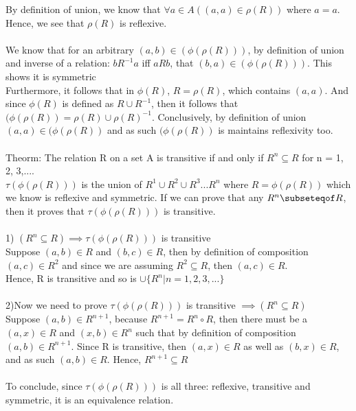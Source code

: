 \documentclass[addpoints]{exam}
\begin{document}
\begin{questions}
      \begin{solution}
    By definition of union, we know that $\forall a \in A ((a, a) \in \rho (R))$ where $a = a$. Hence, we see that $\rho (R)$ is reflexive.
    \\
    \\We know that for an arbitrary $(a, b) \in (\phi (\rho (R)))$, by definition of union and inverse of a relation: $b R^{-1} a$ iff $a R b$, that $(b, a) \in (\phi (\rho (R)))$. This shows it is symmetric
    \\Furthermore, it follows that in $\phi (R)$, $R = \rho (R) $,  which contains $(a, a)$. And since $\phi (R)$ is defined as $R \cup R^{-1}$, then it follows that $(\phi (\rho (R)) = \rho (R) \cup \rho (R)^{-1}$. Conclusively, by definition of union $(a, a) \in (\phi (\rho (R))$ and as such $(\phi (\rho (R))$ is maintains reflexivity too.
    \\
    \\Theorm: The relation R on a set A is transitive if and only if $R^n \subseteq  R$ for n = 1, 2, 3,....
    \\$\tau (\phi (\rho (R)))$ is the union of  $R^1 \cup R^2 \cup R^3 ... R^n$ where $R = \phi (\rho (R))$ which we know is reflexive and symmetric. If we can prove that any $R^{n} \subseteqof R$, then it proves that $\tau (\phi (\rho (R)))$ is transitive.
    \\
    \\1) $(R^{n} \subseteq R)\implies \tau (\phi (\rho (R)))$ is transitive
    \\Suppose $(a, b) \in R$ and $(b, c) \in R$, then by definition of composition
    \\$(a,c) \in R^2$ and since we are assuming $R^2 \subseteq R$, then $(a,c) \in R$. \\Hence, R is transitive and so is $\cup \{ R^n | n = 1,2,3,...\}$
    \\
    \\2)Now we need to prove $\tau (\phi (\rho (R)))$ is transitive $\implies (R^{n} \subseteq R)$
    \\Suppose $(a, b) \in R^{n+1}$, because $R^{n+1} = R^n \circ R$, then there must be a $(a, x) \in R$ and $(x, b) \in R^n$ such that by definition of composition $(a, b) \in R^{n+1}$. Since R is transitive, then $(a, x) \in R$ as well as $(b, x) \in R$, and as such $(a, b) \in R$. Hence, $R^{n+1} \subseteq R$
    \\
    \\To conclude, since $\tau (\phi (\rho (R)))$ is all three: reflexive, transitive and symmetric, it is an equivalence relation.
    
    
    
  \end{solution}


\end{questions}
\end{document}
